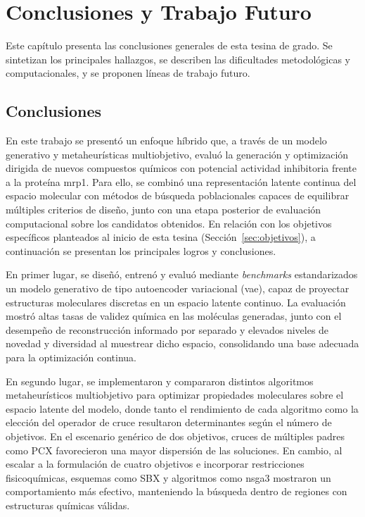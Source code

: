 \chapter{Conclusiones y Trabajo Futuro}
\label{ch:conclusiones}

Este capítulo presenta las conclusiones generales de esta tesina de grado. Se sintetizan los principales hallazgos, se describen las dificultades metodológicas y computacionales, y se proponen líneas de trabajo futuro.

\section{Conclusiones}
\label{sec:conclusiones}

En este trabajo se presentó un enfoque híbrido que, a través de un modelo generativo y metaheurísticas multiobjetivo, evaluó la generación y optimización dirigida de nuevos compuestos químicos con potencial actividad inhibitoria frente a la proteína \gls{mrp1}. Para ello, se combinó una representación latente continua del espacio molecular con métodos de búsqueda poblacionales capaces de equilibrar múltiples criterios de diseño, junto con una etapa posterior de evaluación computacional sobre los candidatos obtenidos. En relación con los objetivos específicos planteados al inicio de esta tesina (Sección~\ref{sec:objetivos}), a continuación se presentan los principales logros y conclusiones.

En primer lugar, se diseñó, entrenó y evaluó mediante \textit{benchmarks} estandarizados un modelo generativo de tipo autoencoder variacional (\gls{vae}), capaz de proyectar estructuras moleculares discretas en un espacio latente continuo. La evaluación mostró altas tasas de validez química en las moléculas generadas, junto con el desempeño de reconstrucción informado por separado y elevados niveles de novedad y diversidad al muestrear dicho espacio, consolidando una base adecuada para la optimización continua.

En segundo lugar, se implementaron y compararon distintos algoritmos metaheurísticos multiobjetivo para optimizar propiedades moleculares sobre el espacio latente del modelo, donde tanto el rendimiento de cada algoritmo como la elección del operador de cruce resultaron determinantes según el número de objetivos. En el escenario genérico de dos objetivos, cruces de múltiples padres como PCX favorecieron una mayor dispersión de las soluciones. En cambio, al escalar a la formulación de cuatro objetivos e incorporar restricciones fisicoquímicas, esquemas como SBX y algoritmos como \acrshort{nsga3} mostraron un comportamiento más efectivo, manteniendo la búsqueda dentro de regiones con estructuras químicas válidas.

